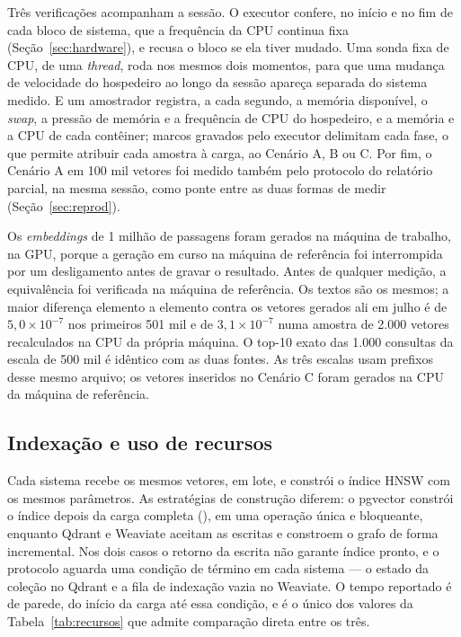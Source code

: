 Três verificações acompanham a sessão. O executor confere, no início e no fim de cada bloco de sistema, que a frequência da CPU continua fixa (Seção~\ref{sec:hardware}), e recusa o bloco se ela tiver mudado. Uma sonda fixa de CPU, de uma \textit{thread}, roda nos mesmos dois momentos, para que uma mudança de velocidade do hospedeiro ao longo da sessão apareça separada do sistema medido. E um amostrador registra, a cada segundo, a memória disponível, o \textit{swap}, a pressão de memória e a frequência de CPU do hospedeiro, e a memória e a CPU de cada contêiner; marcos gravados pelo executor delimitam cada fase, o que permite atribuir cada amostra à carga, ao Cenário A, B ou C. Por fim, o Cenário A em 100 mil vetores foi medido também pelo protocolo do relatório parcial, na mesma sessão, como ponte entre as duas formas de medir (Seção~\ref{sec:reprod}).

Os \textit{embeddings} de 1 milhão de passagens foram gerados na máquina de trabalho, na GPU, porque a geração em curso na máquina de referência foi interrompida por um desligamento antes de gravar o resultado. Antes de qualquer medição, a equivalência foi verificada na máquina de referência. Os textos são os mesmos; a maior diferença elemento a elemento contra os vetores gerados ali em julho é de $5{,}0 \times 10^{-7}$ nos primeiros 501 mil e de $3{,}1 \times 10^{-7}$ numa amostra de 2.000 vetores recalculados na CPU da própria máquina. O top-10 exato das 1.000 consultas da escala de 500 mil é idêntico com as duas fontes. As três escalas usam prefixos desse mesmo arquivo; os vetores inseridos no Cenário C foram gerados na CPU da máquina de referência.

\subsection{Indexação e uso de recursos}

\label{sec:recursos}

Cada sistema recebe os mesmos vetores, em lote, e constrói o índice HNSW com os mesmos parâmetros. As estratégias de construção diferem: o pgvector constrói o índice depois da carga completa (), em uma operação única e bloqueante, enquanto Qdrant e Weaviate aceitam as escritas e constroem o grafo de forma incremental. Nos dois casos o retorno da escrita não garante índice pronto, e o protocolo aguarda uma condição de término em cada sistema --- o estado  da coleção no Qdrant e a fila de indexação vazia no Weaviate. O tempo reportado é de parede, do início da carga até essa condição, e é o único dos valores da Tabela~\ref{tab:recursos} que admite comparação direta entre os três.

